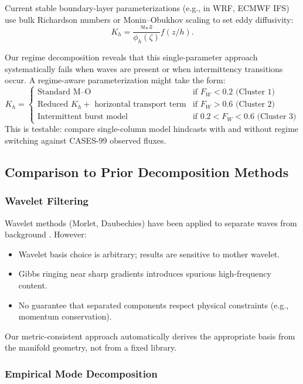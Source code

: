 \documentclass[11pt,a4paper]{article}
\begin{document}
Current stable boundary-layer parameterizations (e.g., in WRF, ECMWF IFS) use bulk Richardson numbers or Monin--Obukhov scaling to set eddy diffusivity:
\begin{equation}
K_h = \frac{u_* z}{\phi_h(\zeta)} f(z/h).
\end{equation}

Our regime decomposition reveals that this single-parameter approach systematically fails when waves are present or when intermittency transitions occur. A regime-aware parameterization might take the form:
\begin{equation}
K_h = \begin{cases}
\text{Standard M--O} & \text{if } F_W < 0.2 \text{ (Cluster 1)} \\
\text{Reduced } K_h + \text{ horizontal transport term} & \text{if } F_W > 0.6 \text{ (Cluster 2)} \\
\text{Intermittent burst model} & \text{if } 0.2 < F_W < 0.6 \text{ (Cluster 3)}
\end{cases}
\end{equation}
This is testable: compare single-column model hindcasts with and without regime switching against CASES-99 observed fluxes.

\subsection{Comparison to Prior Decomposition Methods}

\subsubsection{Wavelet Filtering}

Wavelet methods (Morlet, Daubechies) have been applied to separate waves from background \citep{Vosper2006, Sun2015}. However:
\begin{itemize}
  \item Wavelet basis choice is arbitrary; results are sensitive to mother wavelet.
  \item Gibbs ringing near sharp gradients introduces spurious high-frequency content.
  \item No guarantee that separated components respect physical constraints (e.g., momentum conservation).
\end{itemize}
Our metric-consistent approach automatically derives the appropriate basis from the manifold geometry, not from a fixed library.

\subsubsection{Empirical Mode Decomposition}
\end{document}
